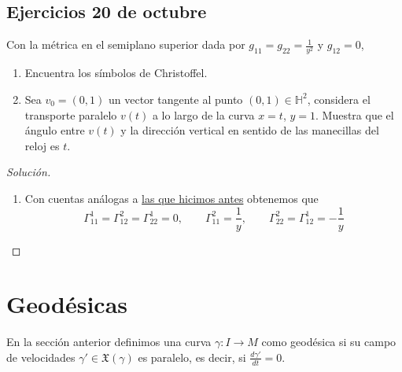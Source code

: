 \documentclass[spanish]{book}
\theoremstyle{definition}
\newcommand{\Hy}{\mathbb{H}}
\newcommand{\X}{\mathfrak{X}}
\DeclareMathOperator{\sen}{sen}
\begin{document}
	\subsection{Ejercicios 20 de octubre}
	Con la métrica en el semiplano superior dada por $g_{11}=g_{22}=\frac{1}{y^2}$ y $g_{12}=0$,
	\begin{enumerate}
		\item Encuentra los símbolos de Christoffel.
		\item Sea $v_0=(0,1)$ un vector tangente al punto $(0,1)\in\Hy^2$, considera el transporte paralelo $v(t)$ a lo largo de la curva $x=t$, $y=1$. Muestra que el ángulo entre $v(t)$ y la dirección vertical en sentido de las manecillas del reloj es $t$.
	\end{enumerate}
	\begin{proof}[Solución]\leavevmode
		\begin{enumerate}
			\item Con cuentas análogas a \hyperref[ejem:chsitorffel-hip]{las que hicimos antes} obtenemos que
			\[\Gamma^1_{11}=\Gamma^2_{12}=\Gamma^1_{22}=0,\qquad \Gamma_{11}^2=\frac{1}{y},\qquad \Gamma_{22}^2=\Gamma^1_{12}=-\frac{1}{y}\]
		\end{enumerate}
	\end{proof}
	
	\section{Geodésicas}
	En la sección anterior definimos una curva $\gamma:I\to M$ como geodésica si su campo de velocidades $\gamma'\in\X(\gamma)$ es paralelo, es decir, si $\frac{d\gamma'}{dt}=0$.
	
\end{document}
